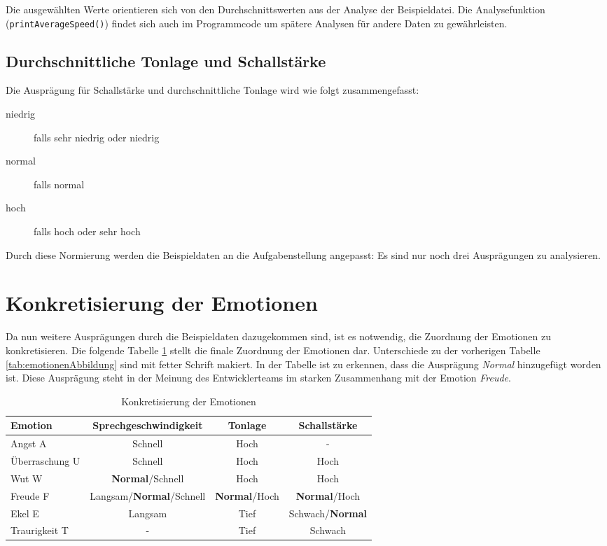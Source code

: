 Die ausgewählten Werte orientieren sich von den Durchschnittswerten aus der Analyse der Beispieldatei. Die Analysefunktion (\verb|printAverageSpeed()|) findet sich auch im Programmcode um spätere Analysen für andere Daten zu gewährleisten.

\subsection{Durchschnittliche Tonlage und Schallstärke}
Die Ausprägung für Schallstärke und durchschnittliche Tonlage wird wie folgt zusammengefasst:
\begin{description}
\item [niedrig] falls sehr niedrig oder niedrig
\item [normal] falls normal
\item [hoch] falls hoch oder sehr hoch
\end{description}
Durch diese Normierung werden die Beispieldaten an die Aufgabenstellung angepasst: Es sind nur noch drei Ausprägungen zu analysieren.

\section{Konkretisierung der Emotionen}
Da nun weitere Ausprägungen durch die Beispieldaten dazugekommen sind, ist es notwendig, die Zuordnung der Emotionen zu konkretisieren. Die folgende Tabelle \ref{tab:konkretisierteEmotionen} stellt die finale Zuordnung der Emotionen dar. Unterschiede zu der vorherigen Tabelle \ref{tab:emotionenAbbildung} sind mit fetter Schrift makiert. In der Tabelle ist zu erkennen, dass die Ausprägung \textit{Normal} hinzugefügt worden ist. Diese Ausprägung steht in der Meinung des Entwicklerteams im starken Zusammenhang mit der Emotion \textit{Freude}. 

\begin{table}[h]
\begin{tabular}{ l | c | c | c}
  Emotion & Sprechgeschwindigkeit & Tonlage & Schallstärke \\
  \hline 
  Angst A & Schnell & Hoch & - \\
  Überraschung U & Schnell & Hoch & Hoch \\
  Wut W & \textbf{Normal}/Schnell & Hoch & Hoch \\
  Freude F & Langsam/\textbf{Normal}/Schnell & \textbf{Normal}/Hoch &\textbf{Normal}/Hoch\\
  Ekel E & Langsam & Tief & Schwach/\textbf{Normal} \\
  Traurigkeit T & - & Tief & Schwach \\
\end{tabular}
\caption{Konkretisierung der Emotionen}
\label{tab:konkretisierteEmotionen}
\end{table}

